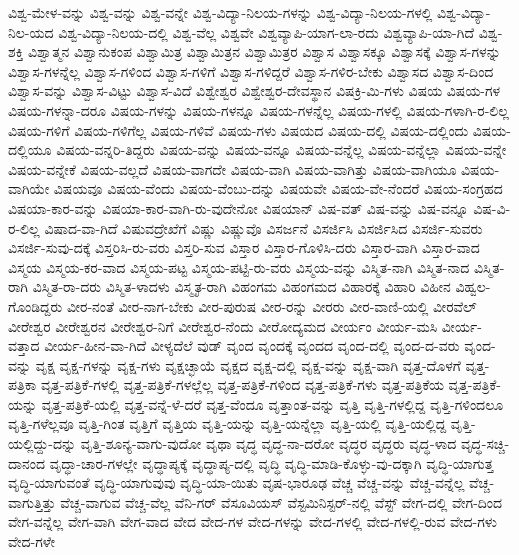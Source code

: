 {ವಿಶ್ವ-ಮೇಳ-ವನ್ನು
ವಿಶ್ವ-ವನ್ನು
ವಿಶ್ವ-ವನ್ನೇ
ವಿಶ್ವ-ವಿದ್ಯಾ-ನಿಲಯ-ಗಳನ್ನು
ವಿಶ್ವ-ವಿದ್ಯಾ-ನಿಲಯ-ಗಳಲ್ಲಿ
ವಿಶ್ವ-ವಿದ್ಯಾ-ನಿಲ-ಯದ
ವಿಶ್ವ-ವಿದ್ಯಾ-ನಿಲಯ-ದಲ್ಲಿ
ವಿಶ್ವ-ವೆಲ್ಲ
ವಿಶ್ವವೇ
ವಿಶ್ವವ್ಯಾಪಿ-ಯಾಗ-ಲಾ-ರದು
ವಿಶ್ವವ್ಯಾಪಿ-ಯಾ-ಗಿದೆ
ವಿಶ್ವ-ಶಕ್ತಿ
ವಿಶ್ವಾತ್ಮನ
ವಿಶ್ವಾನುಕಂಪ
ವಿಶ್ವಾಮಿತ್ರ
ವಿಶ್ವಾಮಿತ್ರನ
ವಿಶ್ವಾಮಿತ್ರರ
ವಿಶ್ವಾಸ
ವಿಶ್ವಾಸಕ್ಕೂ
ವಿಶ್ವಾಸಕ್ಕೆ
ವಿಶ್ವಾಸ-ಗಳನ್ನು
ವಿಶ್ವಾಸ-ಗಳನ್ನೆಲ್ಲ
ವಿಶ್ವಾಸ-ಗಳಿಂದ
ವಿಶ್ವಾಸ-ಗಳಿಗೆ
ವಿಶ್ವಾಸ-ಗಳಿದ್ದರೆ
ವಿಶ್ವಾಸ-ಗಳಿರ-ಬೇಕು
ವಿಶ್ವಾಸದ
ವಿಶ್ವಾಸ-ದಿಂದ
ವಿಶ್ವಾಸ-ವನ್ನು
ವಿಶ್ವಾಸ-ವಿಟ್ಟು
ವಿಶ್ವಾಸ-ವಿದೆ
ವಿಶ್ವೇಶ್ವರ
ವಿಶ್ವೇಶ್ವರ-ದೇವಸ್ಥಾನ
ವಿಷಕ್ರಿ-ಮಿ-ಗಳು
ವಿಷಯ
ವಿಷಯ-ಗಳ
ವಿಷಯ-ಗಳನ್ನಾ-ದರೂ
ವಿಷಯ-ಗಳನ್ನು
ವಿಷಯ-ಗಳನ್ನೂ
ವಿಷಯ-ಗಳನ್ನೆಲ್ಲ
ವಿಷಯ-ಗಳಲ್ಲಿ
ವಿಷಯ-ಗಳಾಗಿ-ರ-ಲಿಲ್ಲ
ವಿಷಯ-ಗಳಿಗೆ
ವಿಷಯ-ಗಳಿಗೆಲ್ಲ
ವಿಷಯ-ಗಳಿವೆ
ವಿಷಯ-ಗಳು
ವಿಷಯದ
ವಿಷಯ-ದಲ್ಲಿ
ವಿಷಯ-ದಲ್ಲಿಂದು
ವಿಷಯ-ದಲ್ಲಿಯೂ
ವಿಷಯ-ವನ್ನರಿ-ತಿದ್ದರು
ವಿಷಯ-ವನ್ನು
ವಿಷಯ-ವನ್ನೂ
ವಿಷಯ-ವನ್ನೆಲ್ಲ
ವಿಷಯ-ವನ್ನೆಲ್ಲಾ
ವಿಷಯ-ವನ್ನೇ
ವಿಷಯ-ವನ್ನೇಕೆ
ವಿಷಯ-ವಲ್ಲದೆ
ವಿಷಯ-ವಾಗದೇ
ವಿಷಯ-ವಾಗಿ
ವಿಷಯ-ವಾಗಿತ್ತು
ವಿಷಯ-ವಾಗಿಯೂ
ವಿಷಯ-ವಾಗಿಯೇ
ವಿಷಯವೂ
ವಿಷಯ-ವೆಂದು
ವಿಷಯ-ವೆಂಬು-ದನ್ನು
ವಿಷಯವೇ
ವಿಷಯ-ವೇ-ನೆಂದರೆ
ವಿಷಯ-ಸಂಗ್ರಹದ
ವಿಷಯಾ-ಕಾರ-ವನ್ನು
ವಿಷಯಾ-ಕಾರ-ವಾಗಿ-ರು-ವುದೇನೋ
ವಿಷಯಾನ್
ವಿಷ-ವತ್
ವಿಷ-ವನ್ನು
ವಿಷ-ವನ್ನೂ
ವಿಷ-ವಿ-ರ-ಲಿಲ್ಲ
ವಿಷಾದ-ವಾ-ಗಿದೆ
ವಿಷುವದ್ರೇಖೆಗೆ
ವಿಷ್ಣು
ವಿಷ್ಣುವೊ
ವಿಸರ್ಜನೆ
ವಿಸರ್ಜಿಸಿ
ವಿಸರ್ಜಿಸಿದ
ವಿಸರ್ಜಿ-ಸುವರು
ವಿಸರ್ಜಿ-ಸುವು-ದಕ್ಕೆ
ವಿಸ್ತರಿಸಿ-ರು-ವರು
ವಿಸ್ತರಿ-ಸುವ
ವಿಸ್ತಾರ
ವಿಸ್ತಾರ-ಗೊಳಿಸಿ-ದರು
ವಿಸ್ತಾರ-ವಾಗಿ
ವಿಸ್ತಾರ-ವಾದ
ವಿಸ್ಮಯ
ವಿಸ್ಮಯ-ಕರ-ವಾದ
ವಿಸ್ಮಯ-ಪಟ್ಟ
ವಿಸ್ಮಯ-ಪಟ್ಟಿ-ರು-ವರು
ವಿಸ್ಮಯ-ವನ್ನು
ವಿಸ್ಮಿತ-ನಾಗಿ
ವಿಸ್ಮಿತ-ನಾದ
ವಿಸ್ಮಿತ-ರಾಗಿ
ವಿಸ್ಮಿತ-ರಾ-ದರು
ವಿಸ್ಮಿತ-ಳಾದಳು
ವಿಸ್ಮೃತ-ರಾಗಿ
ವಿಹಂಗಮ
ವಿಹಂಗಮದ
ವಿಹಾರಕ್ಕೆ
ವಿಹಾರಿ
ವಿಹೀನ
ವಿಹ್ವಲ-ಗೊಂಡಿದ್ದರು
ವೀರ-ನಂತೆ
ವೀರ-ನಾಗ-ಬೇಕು
ವೀರ-ಪುರುಷ
ವೀರ-ರನ್ನು
ವೀರರು
ವೀರ-ವಾಣಿ-ಯಲ್ಲಿ
ವೀರವೆಲ್
ವೀರೇಶ್ವರ
ವೀರೇಶ್ವರನ
ವೀರೇಶ್ವರ-ನಿಗೆ
ವೀರೇಶ್ವರ-ನೆಂದು
ವೀರೋದ್ಯಮದ
ವೀರ್ಯಂ
ವೀರ್ಯ-ಮಸಿ
ವೀರ್ಯ-ವತ್ತಾದ
ವೀರ್ಯ-ಹೀನ-ವಾ-ಗಿದೆ
ವೀಳ್ಯದೆಲೆ
ವುಡ್
ವೃಂದ
ವೃಂದಕ್ಕೆ
ವೃಂದದ
ವೃಂದ-ದಲ್ಲಿ
ವೃಂದ-ದ-ವರು
ವೃಂದ-ವನ್ನು
ವೃಕ್ಷ
ವೃಕ್ಷ-ಗಳನ್ನು
ವೃಕ್ಷ-ಗಳು
ವೃಕ್ಷಚ್ಛಾಯೆ
ವೃಕ್ಷದ
ವೃಕ್ಷ-ದಲ್ಲಿ
ವೃಕ್ಷ-ವನ್ನು
ವೃಕ್ಷ-ವಾಗಿ
ವೃತ್ತ-ದೊಳಗೆ
ವೃತ್ತ-ಪತ್ರಿಕಾ
ವೃತ್ತ-ಪತ್ರಿಕೆ-ಗಳಲ್ಲಿ
ವೃತ್ತ-ಪತ್ರಿಕೆ-ಗಳಲ್ಲೆಲ್ಲ
ವೃತ್ತ-ಪತ್ರಿಕೆ-ಗಳಿಂದ
ವೃತ್ತ-ಪತ್ರಿಕೆ-ಗಳು
ವೃತ್ತ-ಪತ್ರಿಕೆಯ
ವೃತ್ತ-ಪತ್ರಿಕೆ-ಯನ್ನು
ವೃತ್ತ-ಪತ್ರಿಕೆ-ಯಲ್ಲಿ
ವೃತ್ತ-ವನ್ನೆ-ಳೆ-ದರೆ
ವೃತ್ತ-ವೆಂದೂ
ವೃತ್ತಾಂತ-ವನ್ನು
ವೃತ್ತಿ
ವೃತ್ತಿ-ಗಳಲ್ಲಿದ್ದ
ವೃತ್ತಿ-ಗಳಿಂದಲೂ
ವೃತ್ತಿ-ಗಳೆಲ್ಲವೂ
ವೃತ್ತಿ-ಗಿಂತ
ವೃತ್ತಿಗೆ
ವೃತ್ತಿಯ
ವೃತ್ತಿ-ಯನ್ನು
ವೃತ್ತಿ-ಯನ್ನೆಲ್ಲಾ
ವೃತ್ತಿ-ಯಲ್ಲಿ
ವೃತ್ತಿ-ಯಲ್ಲಿದ್ದ
ವೃತ್ತಿ-ಯಲ್ಲಿದ್ದು-ದನ್ನು
ವೃತ್ತಿ-ಶೂನ್ಯ-ವಾಗು-ವುದೋ
ವೃಥಾ
ವೃದ್ಧ
ವೃದ್ಧ-ನಾ-ದರೋ
ವೃದ್ಧರ
ವೃದ್ಧರು
ವೃದ್ಧ-ಳಾದ
ವೃದ್ಧ-ಸಚ್ಚಿ-ದಾನಂದ
ವೃದ್ಧಾ-ಚಾರ-ಗಳಲ್ಲೇ
ವೃದ್ಧಾಪ್ಯಕ್ಕೆ
ವೃದ್ಧಾಪ್ಯ-ದಲ್ಲಿ
ವೃದ್ಧಿ
ವೃದ್ಧಿ-ಮಾಡಿ-ಕೊಳ್ಳು-ವು-ದಕ್ಕಾಗಿ
ವೃದ್ಧಿ-ಯಾಗುತ್ತ
ವೃದ್ಧಿ-ಯಾಗುವಂತೆ
ವೃದ್ಧಿ-ಯಾಗುವುವು
ವೃದ್ಧಿ-ಯಾ-ಯಿತು
ವೃಷ-ಭಾರೂಢ
ವೆಚ್ಚ
ವೆಚ್ಚ-ವನ್ನು
ವೆಚ್ಚ-ವನ್ನೆಲ್ಲ
ವೆಚ್ಚ-ವಾಗುತ್ತಿತ್ತು
ವೆಚ್ಚ-ವಾಗುವ
ವೆಚ್ಚ-ವೆಲ್ಲ
ವೆನಿ-ಗರ್
ವೆಸೂವಿಯಸ್
ವೆಸ್ಟಮಿನಿಸ್ಟರ್-ನಲ್ಲಿ
ವೆಸ್ಟ್
ವೇಗ-ದಲ್ಲಿ
ವೇಗ-ದಿಂದ
ವೇಗ-ವನ್ನೆಲ್ಲ
ವೇಗ-ವಾಗಿ
ವೇಗ-ವಾದ
ವೇದ
ವೇದ-ಗಳ
ವೇದ-ಗಳನ್ನು
ವೇದ-ಗಳಲ್ಲಿ
ವೇದ-ಗಳಲ್ಲಿ-ರುವ
ವೇದ-ಗಳು
ವೇದ-ಗಳೇ
}
